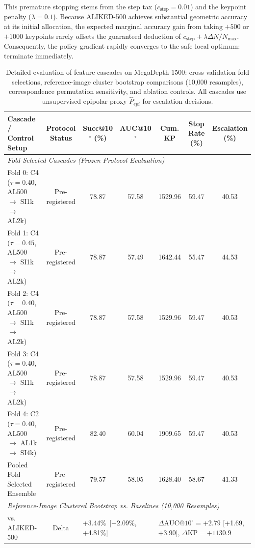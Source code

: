 \documentclass[conference]{IEEEtran}
\begin{document}
This premature stopping stems from the step tax ($c_{\text{step}} = 0.01$) and the keypoint penalty ($\lambda = 0.1$). Because ALIKED-500 achieves substantial geometric accuracy at its initial allocation, the expected marginal accuracy gain from taking $+500$ or $+1000$ keypoints rarely offsets the guaranteed deduction of $c_{\text{step}} + \lambda \Delta N / N_{\max}$. Consequently, the policy gradient rapidly converges to the safe local optimum: terminate immediately.

\begin{table}[t]
\centering
\caption{Detailed evaluation of feature cascades on MegaDepth-1500: cross-validation fold selections, reference-image cluster bootstrap comparisons (10,000 resamples), correspondence permutation sensitivity, and ablation controls. All cascades use unsupervised epipolar proxy $\hat{P}_{epi}$ for escalation decisions.}
\label{tab:cascade_results}
\small
\begin{tabular}{lcccccc}
\hline
\textbf{Cascade / Control Setup} & \textbf{Protocol Status} & \textbf{Succ@10$^\circ$ (\%)} & \textbf{AUC@10$^\circ$} & \textbf{Cum. KP} & \textbf{Stop Rate (\%)} & \textbf{Escalation (\%)} \\
\hline
\multicolumn{7}{l}{\textit{Fold-Selected Cascades (Frozen Protocol Evaluation)}} \\
Fold 0: C4 ($\tau=0.40$, AL500 $\to$ SI1k $\to$ AL2k) & Pre-registered & 78.87 & 57.58 & 1529.96 & 59.47 & 40.53 \\
Fold 1: C4 ($\tau=0.45$, AL500 $\to$ SI1k $\to$ AL2k) & Pre-registered & 78.87 & 57.49 & 1642.44 & 55.47 & 44.53 \\
Fold 2: C4 ($\tau=0.40$, AL500 $\to$ SI1k $\to$ AL2k) & Pre-registered & 78.87 & 57.58 & 1529.96 & 59.47 & 40.53 \\
Fold 3: C4 ($\tau=0.40$, AL500 $\to$ SI1k $\to$ AL2k) & Pre-registered & 78.87 & 57.58 & 1529.96 & 59.47 & 40.53 \\
Fold 4: C2 ($\tau=0.40$, AL500 $\to$ AL1k $\to$ SI4k) & Pre-registered & 82.40 & 60.04 & 1909.65 & 59.47 & 40.53 \\
Pooled Fold-Selected Ensemble & Pre-registered & 79.57 & 58.05 & 1628.40 & 58.67 & 41.33 \\
\hline
\multicolumn{7}{l}{\textit{Reference-Image Clustered Bootstrap vs. Baselines (10,000 Resamples)}} \\
vs. ALIKED-500 & Delta & \multicolumn{2}{l}{+3.44\%\ [+2.09\%, +4.81\%]} & \multicolumn{3}{l}{$\Delta\text{AUC}@10^\circ = +2.79$ [+1.69, +3.90], $\Delta\text{KP} = +1130.9$} \\

\end{tabular}
\end{table}
\end{document}
